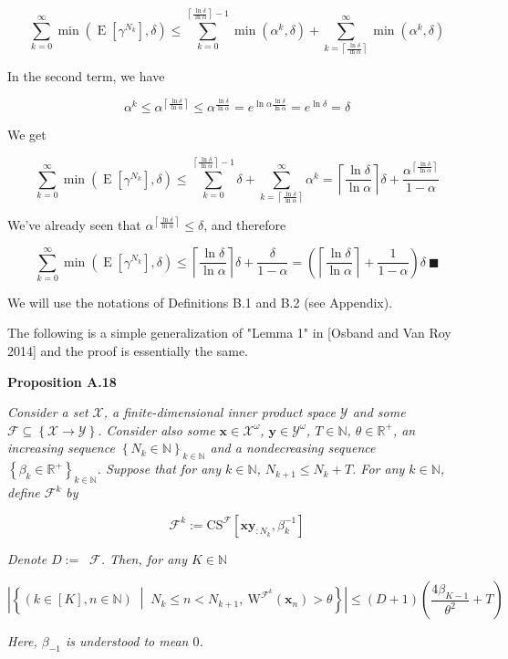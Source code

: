 \documentclass[a4paper]{article}
\newcommand{\Co}[1]{}
\newcommand{\San}[1]{}
\newcommand{\AP}[1]{\left(#1\right)}
\newcommand{\AB}[1]{\left[#1\right]}
\newcommand{\AC}[1]{\left\{#1\right\}}
\newcommand{\ACM}[2]{\left\{#1\;\middle\vert\;#2\right\}}
\newcommand{\Abs}[1]{\left\vert #1 \right\vert}
\newcommand{\Ceil}[1]{\left\lceil #1 \right\rceil}
\newcommand{\E}[1]{\operatorname{E}\AB{#1}}
\newcommand{\Nats}{\mathbb{N}}
\newcommand{\Reals}{\mathbb{R}}
\DeclareMathOperator{\RVO}{\dim_{RVO}}
\newcommand{\X}{\mathcal{X}}
\newcommand{\Y}{\mathcal{Y}}
\newcommand{\F}{\mathcal{F}}
\newcommand{\CS}{\mathrm{CS}}
\newcommand{\W}{\mathrm{W}}
\begin{document}
$$\sum_{k=0}^\infty\min\AP{\E{\gamma^{N_k}},\delta}\leq\sum_{k=0}^{\Ceil{\frac{\ln\delta}{\ln\alpha}}-1}\min\AP{\alpha^k,\delta}+\sum_{k=\Ceil{\frac{\ln\delta}{\ln\alpha}}}^\infty\min\AP{\alpha^k,\delta}$$

In the second term, we have

$$\alpha^k\leq\alpha^{\Ceil{\frac{\ln\delta}{\ln\alpha}}}\leq\alpha^{\frac{\ln\delta}{\ln\alpha}}=e^{\ln\alpha\frac{\ln\delta}{\ln\alpha}}=e^{\ln\delta}=\delta$$

We get

$$\sum_{k=0}^\infty\min\AP{\E{\gamma^{N_k}},\delta}\leq\sum_{k=0}^{\Ceil{\frac{\ln\delta}{\ln\alpha}}-1}\delta+\sum_{k=\Ceil{\frac{\ln\delta}{\ln\alpha}}}^\infty\alpha^k=\Ceil{\frac{\ln\delta}{\ln\alpha}}\delta+\frac{\alpha^{\Ceil{\frac{\ln\delta}{\ln\alpha}}}}{1-\alpha}$$

We've already seen that $\alpha^{\Ceil{\frac{\ln\delta}{\ln\alpha}}}\leq\delta$, and therefore

$$\sum_{k=0}^\infty\min\AP{\E{\gamma^{N_k}},\delta}\leq\Ceil{\frac{\ln\delta}{\ln\alpha}}\delta+\frac{\delta}{1-\alpha}=\AP{\Ceil{\frac{\ln\delta}{\ln\alpha}}+\frac{1}{1-\alpha}}\delta\ \blacksquare$$

We will use the notations of Definitions B.1 and B.2 (see Appendix).

The following is a simple generalization of "Lemma 1" in [Osband and Van Roy 2014]\San{(https://arxiv.org/abs/1406.1853)} and the proof is essentially the same.

\textbf{Proposition A.18}\Co{b}

\textit{Consider a set $\X$, a finite-dimensional inner product space $\Y$ and some $\F\subseteq\AC{\X\rightarrow\Y}$. Consider also some $\boldsymbol{x}\in\X^\omega$, $\boldsymbol{y}\in\Y^\omega$, $T\in\Nats$, $\theta\in\Reals^+$, an increasing sequence $\AC{N_k\in\Nats}_{k\in\Nats}$ and a nondecreasing sequence $\AC{\beta_k\in\Reals^+}_{k\in\Nats}$. Suppose that for any $k\in\Nats$, $N_{k+1}\leq N_k+T$. For any $k\in\Nats$, define $\F^k$ by}\Co{i}

$$\F^k:=\CS^\F\AB{\boldsymbol{xy}_{:N_k},\beta_k^{-1}}$$

\textit{Denote $D:=\RVO\F$. Then, for any $K\in\Nats$}\Co{i}

$$\Abs{\ACM{\AP{k\in[K],n\in\Nats}}{N_k\leq n<N_{k+1},\ \W^{\F^{k}}\AP{\boldsymbol{x}_{n}}>\theta}}\leq(D+1)\AP{\frac{4\beta_{K-1}}{\theta^{2}}+T}$$

\textit{Here, $\beta_{-1}$ is understood to mean $0$.}\Co{i}
\end{document}
